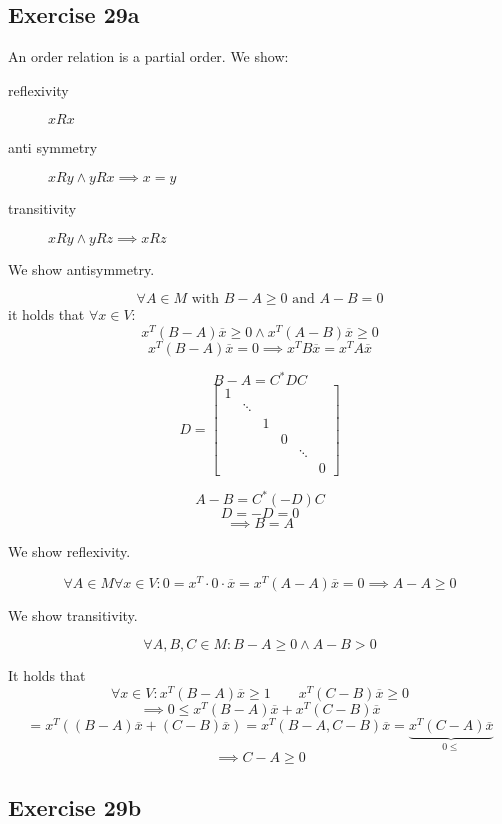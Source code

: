 \documentclass[a4paper]{article}
\theoremstyle{definition}
\begin{document}
\subsection{Exercise 29a}

An order relation is a partial order. We show:
\begin{description}
  \item[reflexivity] $xRx$
  \item[anti symmetry] $xRy \land yRx \implies x = y$
  \item[transitivity] $xRy \land yRz \implies xRz$
\end{description}

We show antisymmetry.

\[ \forall A \in M \text{ with } B-A \geq 0 \text{ and } A - B = 0 \]
it holds that $\forall x \in V:$
\[ x^T (B - A) \overline{x} \geq 0 \land x^T (A - B) \overline{x} \geq 0 \]
\[ x^T (B - A) \overline{x} = 0 \implies x^T B \overline{x} = x^T A \overline{x} \]


\[ B - A = C^* DC \]
\[ D = \begin{bmatrix} 1 &  & & &  & \\ & \ddots & & &  & \\ & & 1 & & & \\ & & & 0 & & \\ & & & & \ddots & \\ & & & & & 0 \end{bmatrix} \]

\[ A - B = C^* (-D) C \]
\[ D = -D = 0 \]
\[ \implies B = A \]

We show reflexivity.

\[ \forall A \in M \forall x \in V: 0 = x^T \cdot 0 \cdot \overline{x} = x^T (A - A) \overline{x} = 0 \implies A - A \geq 0 \]

We show transitivity.

\[ \forall A, B, C \in M: B - A \geq 0 \land A - B > 0 \]

It holds that
\[ \forall x \in V: x^T (B - A) \overline{x} \geq 1 \qquad x^T (C - B) \overline{x} \geq 0 \]
\[ \implies 0 \leq x^T (B - A) \overline{x} + x^T (C - B) \overline{x} \]
\[ = x^T \left((B - A) \overline{x} + (C - B) \overline{x}\right) = x^T (B - A, C - B) \overline{x} = \underbrace{x^T (C - A) \overline{x}}_{0 \leq} \]
\[ \implies C - A \geq 0 \]

\subsection{Exercise 29b}
\end{document}

